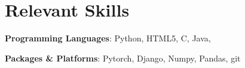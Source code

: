 
\section{Relevant Skills}



\textbf{Programming Languages}: Python, HTML5, C, Java, 

\textbf{Packages \& Platforms}: Pytorch, Django, Numpy, Pandas, git

